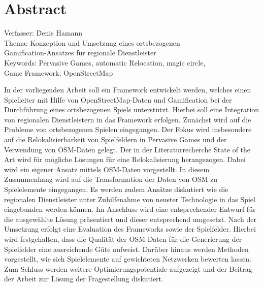 \chapter*{Abstract}
\label{ch0:abstract}

\begin{tabbing}
Verfasser:	 \hspace{20mm} \= Denis Hamann\\
Thema:	  \> Konzeption und Umsetzung eines ortsbezogenen\\
		\> Gamification-Ansatzes für regionale Dienstleister\\
Keywords: \> Pervasive Games, automatic Relocation, magic circle,\\
		\> Game Framework, OpenStreetMap
\end{tabbing}
\vspace{1cm}
In der vorliegenden Arbeit soll ein Framework entwickelt werden, welches einen Spielleiter mit Hilfe von OpenStreetMap-Daten und Gamification bei der Durchführung eines ortsbezogenen Spiels unterstützt. Hierbei soll eine Integration von regionalen Dienstleistern in das Framework erfolgen.
Zunächst wird auf die Probleme von ortsbezogenen Spielen eingegangen.
Der Fokus wird insbesondere auf die Relokalisierbarkeit von Spielfeldern in Pervasive Games und der Verwendung von OSM-Daten gelegt. Der in der Literaturrecherche State of the Art wird für mögliche Lösungen für eine Relokalisierung herangezogen. Dabei wird ein eigener Ansatz mittels OSM-Daten vorgestellt. In diesem Zusammenhang wird auf die Transformation der Daten von OSM zu Spielelemente eingegangen. Es werden zudem Ansätze diskutiert wie die regionalen Dienstleister unter Zuhilfenahme von neuster Technologie in das Spiel eingebunden werden können.
Im Anschluss wird eine entsprechender Entwurf für die ausgewählte Lösung präsentiert und dieser entsprechend umgesetzt. Nach der Umsetzung erfolgt eine Evaluation des Frameworks sowie der Spielfelder. Hierbei wird festgehalten, dass die Qualität der OSM-Daten für die Generierung der Spielfelder eine ausreichende Güte aufweist. Darüber hinaus werden Methoden vorgestellt, wie sich Spielelemente auf gewichteten Netzwerken bewerten lassen. Zum Schluss werden weitere Optimierungspotentiale aufgezeigt und der Beitrag der Arbeit zur Lösung der Fragestellung diskutiert.
